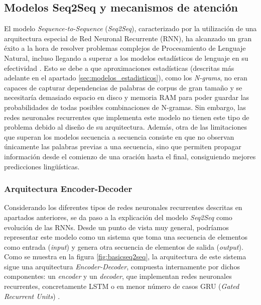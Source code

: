 \subsection{Modelos Seq2Seq y mecanismos de atención}
\label{sec:seq2seq}
El modelo \textit{Sequence-to-Sequence} (\textit{Seq2Seq}), caracterizado por la utilización de una arquitectura especial de Red Neuronal Recurrente (RNN), ha alcanzado un gran éxito a la hora de resolver problemas complejos de Procesamiento de Lenguaje Natural, incluso llegando a superar a los modelos estadísticos de lenguaje en su efectividad \citep{analytics_vidhya_2020}. Esto se debe a que aproximaciones estadísticas (descritas más adelante en el apartado \ref{sec:modelos_estadisticos}), como los \textit{N-grams}, no eran capaces de capturar dependencias de palabras de corpus de gran tamaño y se necesitaría demasiado espacio en disco y memoria RAM para poder guardar las probabilidades de todas posibles combinaciones de N-gramas. Sin embargo, las redes neuronales recurrentes que implementa este modelo no tienen este tipo de problema debido al diseño de su arquitectura. Además, otra de las limitaciones que superan los modelos secuencia a secuencia consiste en que no observan únicamente las palabras previas a una secuencia, sino que permiten propagar información desde el comienzo de una oración hasta el final, consiguiendo mejores predicciones lingüísticas.

\subsubsection{Arquitectura Encoder-Decoder}

Considerando los diferentes tipos de redes neuronales recurrentes descritas en apartados anteriores, se da paso a la explicación del modelo \textit{Seq2Seq} como evolución de las RNNs. Desde un punto de vista muy general, podríamos representar este modelo como un sistema que toma una secuencia de elementos como entrada (\textit{input}) y genera otra secuencia de elementos de salida (\textit{output}). Como se muestra en la figura \ref{fig:basicseq2seq}, la arquitectura de este sistema sigue una arquitectura \textit{Encoder-Decoder}, compuesta internamente por dichos componentes: un \textit{encoder} y un \textit{decoder}, que implementan redes neuronales recurrentes, concretamente LSTM o en menor número de casos GRU (\textit{Gated Recurrent Units}) \citep{sutskever2014sequence}.

